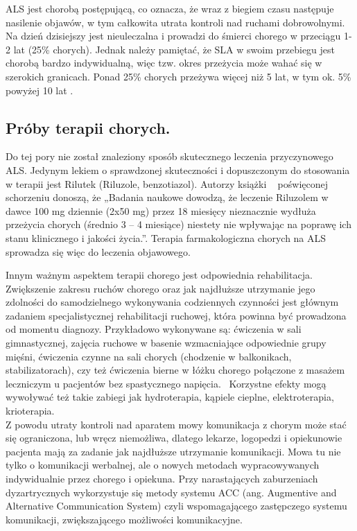 \documentclass[twoside,a4paper]{book}
\begin{document}
ALS jest chorobą postępującą, co oznacza, że wraz z biegiem czasu następuje nasilenie objawów, w tym całkowita utrata kontroli nad ruchami dobrowolnymi. Na dzień dzisiejszy jest nieuleczalna i prowadzi do śmierci chorego w przeciągu 1-2 lat (25\% chorych). Jednak należy pamiętać, że SLA w swoim przebiegu jest chorobą bardzo indywidualną, więc tzw. okres przeżycia może wahać się w szerokich granicach. Ponad 25\% chorych przeżywa więcej niż 5 lat, w tym ok. 5\%  powyżej 10 lat .~\cite{poradnik}
\subsection{Próby terapii chorych.}

Do tej pory nie został znaleziony sposób skutecznego leczenia przyczynowego ALS. Jedynym lekiem o sprawdzonej skuteczności i dopuszczonym do stosowania w terapii  jest Rilutek (Riluzole, benzotiazol). Autorzy książki ~\cite{alsAdamek} poświęconej schorzeniu donoszą, że  „Badania  naukowe  dowodzą, że leczenie Riluzolem w dawce 100 mg dziennie (2x50 mg) przez 18 miesięcy nieznacznie  wydłuża  przeżycia  chorych  (średnio 3 – 4 miesiące)  niestety  nie  wpływając  na  poprawę  ich  stanu  klinicznego  i  jakości życia.”.  Terapia farmakologiczna chorych na ALS sprowadza się więc do leczenia objawowego.  

Innym ważnym aspektem terapii chorego jest odpowiednia rehabilitacja. Zwiększenie zakresu ruchów chorego oraz jak najdłuższe utrzymanie jego zdolności do samodzielnego wykonywania codziennych czynności jest głównym zadaniem specjalistycznej rehabilitacji ruchowej, która powinna być prowadzona od momentu diagnozy. Przykładowo wykonywane są: ćwiczenia w sali gimnastycznej, zajęcia ruchowe w basenie wzmacniające odpowiednie grupy mięśni, ćwiczenia czynne na sali chorych (chodzenie w balkonikach, stabilizatorach), czy też ćwiczenia bierne w łóżku chorego połączone z masażem leczniczym u pacjentów bez spastycznego napięcia.~\cite{alsAdamek} Korzystne efekty mogą wywoływać też takie zabiegi jak hydroterapia, kąpiele cieplne, elektroterapia, krioterapia. ~\cite{poradnik}\\
Z powodu utraty kontroli nad aparatem mowy komunikacja z chorym może stać się ograniczona, lub wręcz niemożliwa, dlatego lekarze, logopedzi i opiekunowie pacjenta mają za zadanie jak najdłuższe utrzymanie komunikacji.  Mowa tu nie tylko o komunikacji werbalnej, ale o nowych metodach wypracowywanych  indywidualnie przez chorego i opiekuna. 
Przy  narastających  zaburzeniach  dyzartrycznych  wykorzystuje  się metody  systemu  ACC  (ang.  Augmentive  and  Alternative  Communication  System)  czyli  wspomagającego  zastępczego  systemu  komunikacji,  zwiększającego możliwości komunikacyjne.~\cite{alsAdamek}
\end{document}
